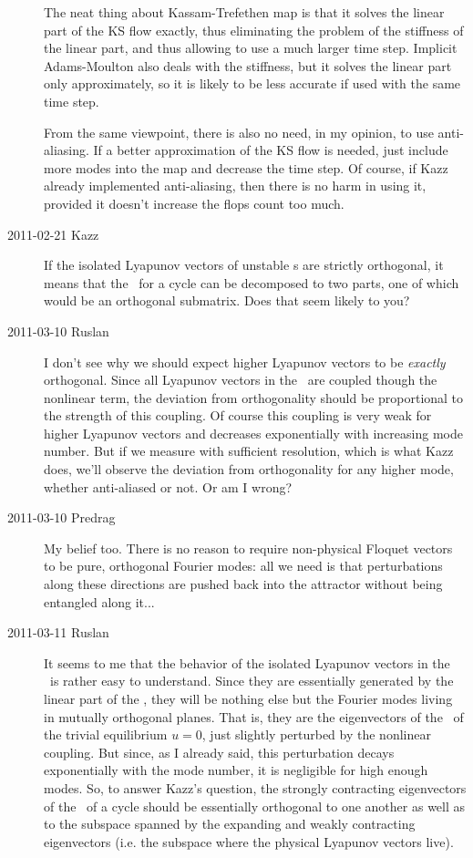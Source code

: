\begin{description}
The neat thing about Kassam-Trefethen map is that it solves the linear
part of the KS flow exactly, thus eliminating the problem of the
stiffness of the linear part, and thus allowing to use a much larger time
step.  Implicit Adams-Moulton also deals with the stiffness, but it
solves the linear part only approximately, so it is likely to be less
accurate if used with the same time step.

From the same viewpoint, there is also no need, in my opinion, to use
anti-aliasing.  If a better approximation of the KS flow is needed, just
include more modes into the map and decrease the time step.  Of course,
if Kazz already implemented anti-aliasing, then there is no harm in using
it, provided it doesn't increase the flops count too much.

\item[2011-02-21 Kazz]
If the isolated Lyapunov vectors of
{unstable \po}s are strictly orthogonal, it means that the \jacobianM\ for a
cycle can be decomposed to two parts, one of which would be an
orthogonal submatrix. Does that seem likely to you?

\item[2011-03-10 Ruslan]
I don't see why we should expect higher Lyapunov vectors to be {\em
exactly} orthogonal.  Since all Lyapunov vectors in the \KSe\ are coupled
though the nonlinear term, the deviation from orthogonality should be
proportional to the strength of this coupling.  Of course this coupling
is very weak for higher Lyapunov vectors and decreases exponentially with
increasing mode number.  But if we measure with sufficient resolution,
which is what Kazz does, we'll observe the deviation from orthogonality
for any higher mode, whether anti-aliased or not.  Or am I wrong?

\item[2011-03-10 Predrag] My belief too. There is no reason to require
non-physical Floquet vectors to be pure, orthogonal Fourier modes: all we
need is that perturbations along these directions are pushed back into
the attractor without being entangled along it...

\item[2011-03-11 Ruslan] It seems to me that the behavior of the isolated
Lyapunov vectors in the \KSe\ is rather easy to understand.  Since they
are essentially generated by the linear part of the \KSe, they will be
nothing else but the Fourier modes living in mutually orthogonal planes.
That is, they are the eigenvectors of the \jacobianM\ of the trivial
equilibrium $u = 0$, just slightly perturbed by the nonlinear coupling.
But since, as I already said, this perturbation decays exponentially with
the mode number, it is negligible for high enough modes.  So, to answer
Kazz's question, the strongly contracting eigenvectors of the \jacobianM\
of a cycle should be essentially orthogonal to one another as well as to
the subspace spanned by the expanding and weakly contracting eigenvectors
(i.e. the subspace where the physical Lyapunov vectors live).


\end{description}
